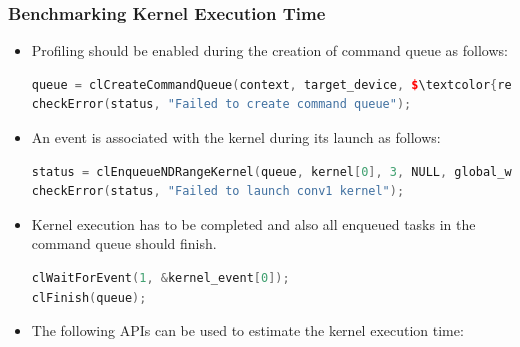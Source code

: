 \subsubsection*{Benchmarking Kernel Execution Time}
\begin{itemize}
\item Profiling should be enabled during the creation of command queue as follows:\\
\begin{minipage}{\textwidth}
\begin{center}
\begin{lstlisting}[columns=fullflexible, language=C++, escapechar = \$, backgroundcolor=\color{gray!10}]
queue = clCreateCommandQueue(context, target_device, $\textcolor{red}{CL\_QUEUE\_PROFILING\_ENABLE}$, &status); 
checkError(status, "Failed to create command queue");
\end{lstlisting}
\end{center}
\end{minipage}
\item An event is associated with the kernel during its launch as follows:\\
\begin{minipage}{\textwidth}
\begin{center}
\begin{lstlisting}[columns=fullflexible, language=C++, escapechar = \$, backgroundcolor=\color{gray!10}]
status = clEnqueueNDRangeKernel(queue, kernel[0], 3, NULL, global_work_size, NULL, 0, NULL, $\textcolor{red}{\&kernel\_event[0]}$);
checkError(status, "Failed to launch conv1 kernel");
\end{lstlisting}
\end{center}
\end{minipage}
\item Kernel execution has to be completed and also all enqueued tasks in the command queue should finish.\\
\begin{minipage}{\textwidth}
\begin{center}
\begin{lstlisting}[columns=fullflexible, language=C++, escapechar = \$, backgroundcolor=\color{gray!10}]
clWaitForEvent(1, &kernel_event[0]);
clFinish(queue);
\end{lstlisting}
\end{center}
\end{minipage}
\item The following APIs can be used to estimate the kernel execution time:\\

\end{itemize}
